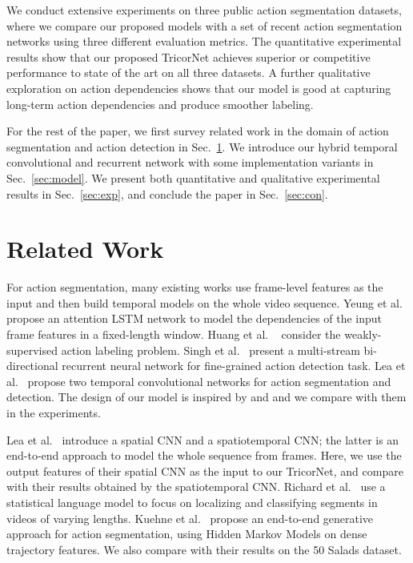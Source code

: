 \documentclass{article}
\begin{document}
We conduct extensive experiments on three public action segmentation datasets, where we compare our proposed models with a set of recent action segmentation networks using three different evaluation metrics. The quantitative experimental results show that our proposed TricorNet achieves superior or competitive performance to state of the art on all three datasets. A further qualitative exploration on action dependencies shows that our model is good at capturing long-term action dependencies and produce smoother labeling. 

For the rest of the paper, we first survey related work in the domain of action segmentation and action detection in Sec.~\ref{sec:related}. We introduce our hybrid temporal convolutional and recurrent network with some implementation variants in Sec.~\ref{sec:model}. We present both quantitative and qualitative experimental results in Sec.~\ref{sec:exp}, and conclude the paper in Sec.~\ref{sec:con}. 

\section{Related Work}
\label{sec:related}

For action segmentation, many existing works use frame-level features as the input and then build temporal models on the whole video sequence. Yeung et al.~\cite{YeRuJiARXIV2015} propose an attention LSTM network to model the dependencies of the input frame features in a fixed-length window. Huang et al. ~\cite{HuFeNiECCV2016} consider the weakly-supervised action labeling problem. Singh et al.~\cite{SiMaJoCVPR2016} present a multi-stream bi-directional recurrent neural network for fine-grained action detection task. Lea et al.~\cite{LeFlViCVPR2017} propose two temporal convolutional networks for action segmentation and detection. The design of our model is inspired by \cite{SiMaJoCVPR2016} and \cite{LeFlViCVPR2017} and we compare with them in the experiments. 

Lea et al.~\cite{scnn} introduce a spatial CNN and a spatiotemporal CNN; the latter is an end-to-end approach to model the whole sequence from frames. Here, we use the output features of their spatial CNN as the input to our TricorNet, and compare with their results obtained by the spatiotemporal CNN. Richard et al.~\cite{richard} use a statistical language model to focus on localizing and classifying segments in videos of varying lengths. Kuehne et al.~\cite{kuehne} propose an end-to-end generative approach for action segmentation, using Hidden Markov Models on dense trajectory features. We also compare with their results on the 50 Salads dataset. 
\end{document}
